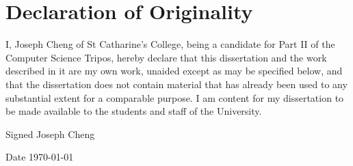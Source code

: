 \documentclass[crop=false]{standalone}
\begin{document}
\section*{Declaration of Originality}

I, Joseph Cheng of St Catharine's College, being a candidate for Part II of the Computer Science Tripos, hereby declare that this dissertation and the work described in it are my own work, unaided except as may be specified below, and that the dissertation does not contain material that has already been used to any substantial extent for a comparable purpose. I am content for my dissertation to be made available to the students and staff of the University.

Signed Joseph Cheng

Date \today
\end{document}
